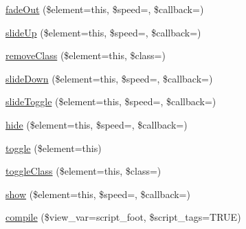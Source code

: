 \begin{DoxyCompactItemize}
\item 
\mbox{\hyperlink{class_c_i___javascript_a7d2f81e611696887be4f8a1edeb55bd4}{fade\+Out}} (\$element=\textquotesingle{}this\textquotesingle{}, \$speed=\textquotesingle{}\textquotesingle{}, \$callback=\textquotesingle{}\textquotesingle{})
\item 
\mbox{\hyperlink{class_c_i___javascript_a3d94535f1d68c62698e733d34152d1f9}{slide\+Up}} (\$element=\textquotesingle{}this\textquotesingle{}, \$speed=\textquotesingle{}\textquotesingle{}, \$callback=\textquotesingle{}\textquotesingle{})
\item 
\mbox{\hyperlink{class_c_i___javascript_a909e52e0a7e3ddd7e6520965618d50f4}{remove\+Class}} (\$element=\textquotesingle{}this\textquotesingle{}, \$class=\textquotesingle{}\textquotesingle{})
\item 
\mbox{\hyperlink{class_c_i___javascript_a252f34441b5adb1b8bec1aa93b4140e1}{slide\+Down}} (\$element=\textquotesingle{}this\textquotesingle{}, \$speed=\textquotesingle{}\textquotesingle{}, \$callback=\textquotesingle{}\textquotesingle{})
\item 
\mbox{\hyperlink{class_c_i___javascript_a7919ca63a6371117a366baacd6412491}{slide\+Toggle}} (\$element=\textquotesingle{}this\textquotesingle{}, \$speed=\textquotesingle{}\textquotesingle{}, \$callback=\textquotesingle{}\textquotesingle{})
\item 
\mbox{\hyperlink{class_c_i___javascript_ace07091981f312c3be8238f08815142c}{hide}} (\$element=\textquotesingle{}this\textquotesingle{}, \$speed=\textquotesingle{}\textquotesingle{}, \$callback=\textquotesingle{}\textquotesingle{})
\item 
\mbox{\hyperlink{class_c_i___javascript_aea72ca9a9b57e1cae194f84dbcb30d70}{toggle}} (\$element=\textquotesingle{}this\textquotesingle{})
\item 
\mbox{\hyperlink{class_c_i___javascript_ab3f471c0411b110bc11f62fa26e9a9e3}{toggle\+Class}} (\$element=\textquotesingle{}this\textquotesingle{}, \$class=\textquotesingle{}\textquotesingle{})
\item 
\mbox{\hyperlink{class_c_i___javascript_a37f187e47112ada2d8ffe4c840556178}{show}} (\$element=\textquotesingle{}this\textquotesingle{}, \$speed=\textquotesingle{}\textquotesingle{}, \$callback=\textquotesingle{}\textquotesingle{})
\item 
\mbox{\hyperlink{class_c_i___javascript_a16edc3063561b4940ebde2714b1b75f4}{compile}} (\$view\+\_\+var=\textquotesingle{}script\+\_\+foot\textquotesingle{}, \$script\+\_\+tags=T\+R\+UE)
\item 

\end{DoxyCompactItemize}
